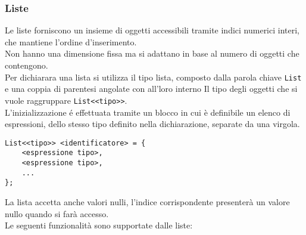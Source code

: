 \subsubsection{Liste}
Le liste forniscono un insieme di oggetti accessibili tramite indici numerici interi, che mantiene l'ordine d'inserimento. \cite{CSharpLang} \\
Non hanno una dimensione fissa ma si adattano in base al numero di oggetti che contengono. \\
Per dichiarara una lista si utilizza il tipo lista, composto dalla parola chiave 
\lstinline|List| e una coppia di parentesi angolate con all'loro interno Il tipo degli 
oggetti che si vuole raggruppare \lstinline|List<<tipo>>|. \\
L'inizializzazione é effettuata tramite un blocco in cui è definibile un elenco di 
espressioni, dello stesso tipo definito nella dichiarazione, separate da una virgola.
\begin{lstlisting}
List<<tipo>> <identificatore> = {
    <espressione tipo>,
    <espressione tipo>,
    ...
};
\end{lstlisting}
La lista accetta anche valori nulli, l'indice corrispondente presenterà un valore nullo quando
si farà accesso. \\
Le seguenti funzionalità sono supportate dalle liste: \\
